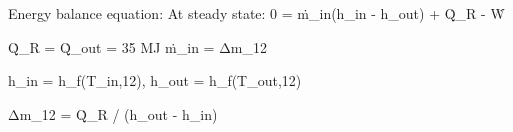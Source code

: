 Energy balance equation:  
At steady state:  
0 = ṁ_in(h_in - h_out) + Q̇_R - Ẇ  

Q̇_R = Q̇_out = 35 MJ  
ṁ_in = Δm_12  

h_in = h_f(T_in,12), h_out = h_f(T_out,12)  

Δm_12 = Q̇_R / (h_out - h_in)